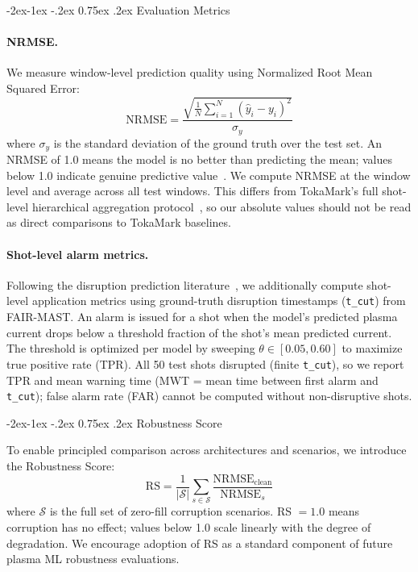 \documentclass[10pt,twocolumn]{article}
\makeatletter
\renewcommand\subsection{\@startsection{subsection}{2}{\z@}%
  {-2ex\@plus -1ex \@minus -.2ex}%
  {0.75ex \@plus .2ex}%
  {\normalfont\large\bfseries}}
\makeatother
\begin{document}
\subsection{Evaluation Metrics}

\paragraph{NRMSE.}
We measure window-level prediction quality using Normalized Root Mean
Squared Error:
\begin{equation}
\text{NRMSE} = \frac{\sqrt{\frac{1}{N}\sum_{i=1}^{N}(\hat{y}_i - y_i)^2}}
{\sigma_y}
\label{eq:nrmse}
\end{equation}
where $\sigma_y$ is the standard deviation of the ground truth over the
test set. An NRMSE of 1.0 means the model is no better than predicting
the mean; values below 1.0 indicate genuine predictive
value~\cite{rousseau2026tokamark}. We compute NRMSE at the window level
and average across all test windows. This differs from TokaMark's
full shot-level hierarchical aggregation protocol~\cite{rousseau2026tokamark},
so our absolute values should not be read as direct comparisons to
TokaMark baselines.

\paragraph{Shot-level alarm metrics.}
Following the disruption prediction literature~\cite{rea2019, spangher2025},
we additionally compute shot-level application metrics using ground-truth
disruption timestamps (\texttt{t\_cut}) from FAIR-MAST. An alarm is
issued for a shot when the model's predicted plasma current drops below
a threshold fraction of the shot's mean predicted current. The threshold
is optimized per model by sweeping $\theta \in [0.05, 0.60]$ to maximize
true positive rate (TPR). All 50 test shots disrupted (finite
\texttt{t\_cut}), so we report TPR and mean warning time (MWT = mean
time between first alarm and \texttt{t\_cut}); false alarm rate (FAR)
cannot be computed without non-disruptive shots.

\subsection{Robustness Score}

To enable principled comparison across architectures and scenarios, we
introduce the Robustness Score:
\begin{equation}
\text{RS} = \frac{1}{|\mathcal{S}|} \sum_{s \in \mathcal{S}}
\frac{\text{NRMSE}_\text{clean}}{\text{NRMSE}_s}
\label{eq:rs}
\end{equation}
where $\mathcal{S}$ is the full set of zero-fill corruption scenarios.
RS $= 1.0$ means corruption has no effect; values below 1.0 scale
linearly with the degree of degradation. We encourage adoption of RS
as a standard component of future plasma ML robustness evaluations.
\end{document}

